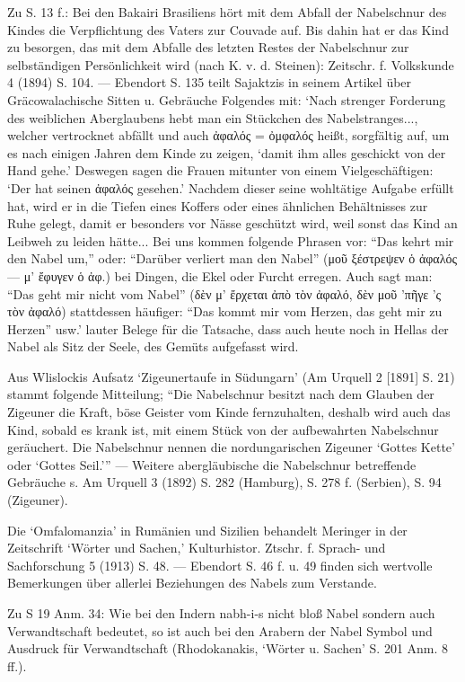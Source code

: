 \documentclass[a4paper, 11pt, oneside]{article}
\begin{document}
Zu S. 13 f.: Bei den Bakairi Brasiliens hört mit dem Abfall der Nabelschnur des Kindes die Verpflichtung des Vaters zur Couvade auf. Bis dahin hat er das Kind zu besorgen, das mit dem Abfalle des letzten Restes der Nabelschnur zur selbständigen Persönlichkeit wird (nach K. v. d. Steinen): Zeitschr. f. Volkskunde 4 (1894) S. 104. --- Ebendort S. 135 teilt Sajaktzis in seinem Artikel über Gräcowalachische Sitten u. Gebräuche Folgendes mit: `Nach strenger Forderung des weiblichen Aberglaubens hebt man ein Stückchen des Nabelstranges..., welcher vertrocknet abfällt und auch ἀφαλός = ὀμφαλός heißt, sorgfältig auf, um es nach einigen Jahren dem Kinde zu zeigen, `damit ihm alles geschickt von der Hand gehe.' Deswegen sagen die Frauen mitunter von einem Vielgeschäftigen: `Der hat seinen ἀφαλός gesehen.' Nachdem dieser seine wohltätige Aufgabe erfüllt hat, wird er in die Tiefen eines Koffers oder eines ähnlichen Behältnisses zur Ruhe gelegt, damit er besonders vor Nässe geschützt wird, weil sonst das Kind an Leibweh zu leiden hätte... Bei uns kommen folgende Phrasen vor: "`Das kehrt mir den Nabel um,"' oder: "`Darüber verliert man den Nabel"' (μοῦ ξέστρεψεν ὁ ἀφαλός --- μ' ἔφυγεν ὁ ἀφ.) bei Dingen, die Ekel oder Furcht erregen. Auch sagt man: "`Das geht mir nicht vom Nabel"' (δὲν μ' ἔρχεται ἀπὸ τὸν ἀφαλό, δὲν μοῦ 'πῆγε 'ς τὸν ἀφαλό) stattdessen häufiger: "`Das kommt mir vom Herzen, das geht mir zu Herzen"' usw.' lauter Belege für die Tatsache, dass auch heute noch in Hellas der Nabel als Sitz der Seele, des Gemüts aufgefasst wird.

Aus Wlislockis Aufsatz `Zigeunertaufe in Südungarn' (Am Urquell 2 [1891] S. 21) stammt folgende Mitteilung; "`Die Nabelschnur besitzt nach dem Glauben der Zigeuner die Kraft, böse Geister vom Kinde fernzuhalten, deshalb wird auch das Kind, sobald es krank ist, mit einem Stück von der aufbewahrten Nabelschnur geräuchert. Die Nabelschnur nennen die nordungarischen Zigeuner `Gottes Kette' oder `Gottes Seil.'"' --- Weitere abergläubische die Nabelschnur betreffende Gebräuche s. Am Urquell 3 (1892) S. 282 (Hamburg), S. 278 f. (Serbien), S. 94 (Zigeuner).

Die `Omfalomanzia' in Rumänien und Sizilien behandelt Meringer in der Zeitschrift `Wörter und Sachen,' Kulturhistor. Ztschr. f. Sprach- und Sachforschung 5 (1913) S. 48. --- Ebendort S. 46 f. u. 49 finden sich wertvolle Bemerkungen über allerlei Beziehungen des Nabels zum Verstande.

Zu S 19 Anm. 34: Wie bei den Indern nabh-i-s nicht bloß Nabel sondern auch Verwandtschaft bedeutet, so ist auch bei den Arabern der Nabel Symbol und Ausdruck für Verwandtschaft (Rhodokanakis, `Wörter u. Sachen' S. 201 Anm. 8 ff.).
\end{document}
